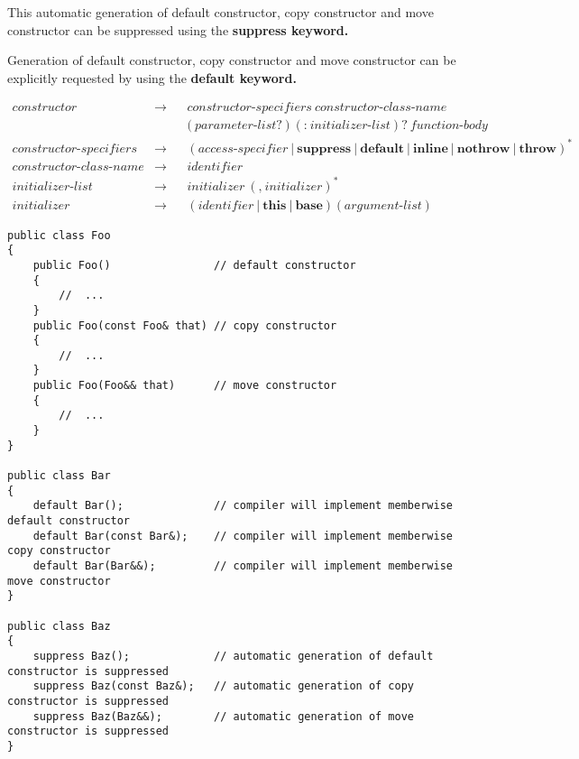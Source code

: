\documentclass[a4paper,oneside,11pt]{article}
\begin{document}
This automatic generation of default constructor, copy constructor and move constructor can be suppressed using the \bf{suppress} keyword.

Generation of default constructor, copy constructor and move constructor can be explicitly requested by using the \bf{default} keyword.

\begin{align*}
constructor &\rightarrow & &constructor\textrm{-}specifiers \> constructor\textrm{-}class\textrm{-}name\\
& & &\texttt{(} \> \hyperref[parameterlist]{parameter\textrm{-}list}? \> \texttt{)} \> (\texttt{:} \> initializer\textrm{-}list)? \>
\hyperref[functionbody]{function\textrm{-}body}\\
constructor\textrm{-}specifiers &\rightarrow & &(\hyperref[accessspecifier]{access\textrm{-}specifier} \> | \>
\textbf{suppress} \> | \> \textbf{default} \> | \> \textbf{inline} \> | \> \textbf{nothrow} \> | \> \textbf{throw})^*\\
constructor\textrm{-}class\textrm{-}name &\rightarrow & &\hyperref[identifier]{identifier}\\
initializer\textrm{-}list &\rightarrow & &initializer \> (\texttt{,} \> initializer)^*\\
initializer &\rightarrow & &(\hyperref[identifier]{identifier} \> | \> \textbf{this} \> | \> \textbf{base}) \> \texttt{(} \>
\hyperref[argumentlist]{argument\textrm{-}list} \> \texttt{)}
\end{align*}

\clearpage
\begin{lstlisting}[frame=trBL]
public class Foo
{
    public Foo()                // default constructor
    {
        //  ...
    }
    public Foo(const Foo& that) // copy constructor
    {
        //  ...
    }
    public Foo(Foo&& that)      // move constructor
    {
        //  ...
    }
}

public class Bar
{
    default Bar();              // compiler will implement memberwise default constructor
    default Bar(const Bar&);    // compiler will implement memberwise copy constructor
    default Bar(Bar&&);         // compiler will implement memberwise move constructor
}

public class Baz
{
    suppress Baz();             // automatic generation of default constructor is suppressed
    suppress Baz(const Baz&);   // automatic generation of copy constructor is suppressed
    suppress Baz(Baz&&);        // automatic generation of move constructor is suppressed
}
\end{lstlisting}
\end{document}
